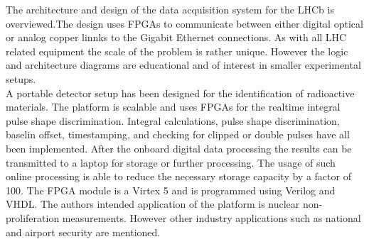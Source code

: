 \documentclass[12pt]{article}
\begin{document}
{\large\textbf{\cite{Haefeli2006119}}}
The architecture and design of the data acquisition system for the LHCb is overviewed.The design uses FPGAs to communicate between either digital optical or analog copper linnks to the Gigabit Ethernet connections. As with all LHC related equipment the scale of the problem is rather unique. However the logic and architecture diagrams are educational and of interest in smaller experimental setups.
\\[20pt]


{\large\textbf{\cite{Schiffer2011491}}}
A portable detector setup has been designed for the identification of radioactive materials. The platform is scalable and uses FPGAs for the realtime integral pulse shape discrimination. Integral calculations, pulse shape discrimination, baselin offset, timestamping, and checking for clipped or double pulses have all been implemented. After the onboard digital data processing the results can be transmitted to a laptop for storage or further processing. The usage of such online processing is able to reduce the necessary storage capacity by a factor of 100. The FPGA module is a Virtex 5 and is programmed using Verilog and VHDL. The authors intended application of the platform is nuclear non-proliferation measurements. However other industry applications such as national and airport security are mentioned.
\\[20pt]





\end{document}
